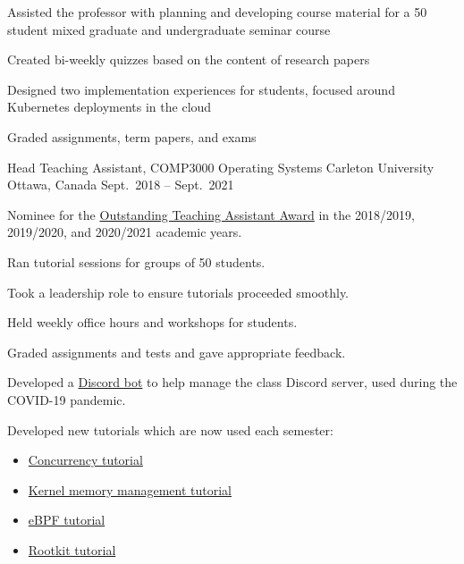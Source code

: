 \begin{cventries}
{\begin{cvitems}
        \item Assisted the professor with planning and developing course material for a 50 student mixed graduate and undergraduate seminar course
        \item Created bi-weekly quizzes based on the content of research papers
        \item Designed two implementation experiences for students, focused around Kubernetes deployments in the cloud
        \item Graded assignments, term papers, and exams
      \end{cvitems}
    }
  \cventry
    {Head Teaching Assistant, COMP3000 Operating Systems} %
    {Carleton University} %
    {Ottawa, Canada} %
    {Sept.\ 2018 -- Sept.\ 2021} %
    {
      \begin{cvitems} %
        \item Nominee for the \href{https://carleton.ca/tasupport/taawards/edc-outstanding-ta-awards/}
            {Outstanding Teaching Assistant Award} in the 2018/2019, 2019/2020, and 2020/2021 academic years.
        \item Ran tutorial sessions for groups of 50 students.
        \item Took a leadership role to ensure tutorials proceeded smoothly.
        \item Held weekly office hours and workshops for students.
        \item Graded assignments and tests and gave appropriate feedback.
        \item Developed a \href{https://github.com/willfindlay/tabot}{Discord bot} to help manage the class Discord server, used during the COVID-19 pandemic.
        \item Developed new tutorials which are now used each semester:
          \begin{itemize}
            \item \href{https://homeostasis.scs.carleton.ca/wiki/index.php/Operating_Systems_2020W:_Tutorial_6}
              {Concurrency tutorial}
            \item \href{https://homeostasis.scs.carleton.ca/wiki/index.php/Operating_Systems_2020W:_Tutorial_8}
              {Kernel memory management tutorial}
            \item \href{https://homeostasis.scs.carleton.ca/wiki/index.php/Operating_Systems_2020W:_Tutorial_9}
              {eBPF tutorial}
            \item \href{https://homeostasis.scs.carleton.ca/wiki/index.php/Operating_Systems_2019F:_Tutorial_9}
              {Rootkit tutorial}
          \end{itemize}
      \end{cvitems}
    }

\end{cventries}
